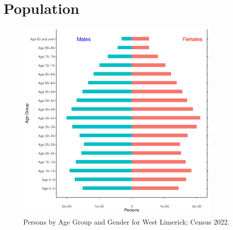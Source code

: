 \documentclass{article}
\begin{document}
\pagebreak

\section{Population} 
\label{sect:Pop}

\begin{figure}[h]
	\centering
	\includegraphics[width = 100mm]{../figures/PyramidPlot.pdf}
	\caption{Persons by Age Group and Gender for West Limerick; Census 2022.}
	\label{fig:2ae19629-1a6a-13a3-e055-000000000001}
	\end{figure}
\end{document}
